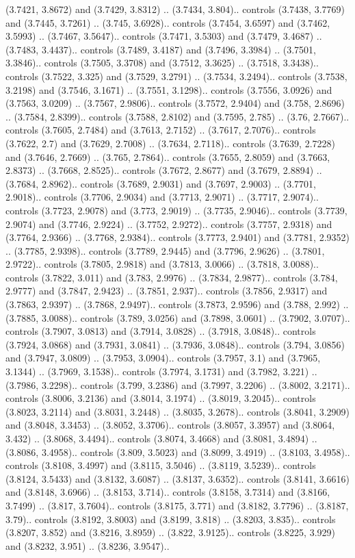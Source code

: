 (3.7421, 3.8672) and (3.7429, 3.8312) .. (3.7434, 3.804).. controls (3.7438, 3.7769) and (3.7445, 3.7261) .. (3.745, 3.6928).. controls (3.7454, 3.6597) and (3.7462, 3.5993) .. (3.7467, 3.5647).. controls (3.7471, 3.5303) and (3.7479, 3.4687) .. (3.7483, 3.4437).. controls (3.7489, 3.4187) and (3.7496, 3.3984) .. (3.7501, 3.3846).. controls (3.7505, 3.3708) and (3.7512, 3.3625) .. (3.7518, 3.3438).. controls (3.7522, 3.325) and (3.7529, 3.2791) .. (3.7534, 3.2494).. controls (3.7538, 3.2198) and (3.7546, 3.1671) .. (3.7551, 3.1298).. controls (3.7556, 3.0926) and (3.7563, 3.0209) .. (3.7567, 2.9806).. controls (3.7572, 2.9404) and (3.758, 2.8696) .. (3.7584, 2.8399).. controls (3.7588, 2.8102) and (3.7595, 2.785) .. (3.76, 2.7667).. controls (3.7605, 2.7484) and (3.7613, 2.7152) .. (3.7617, 2.7076).. controls (3.7622, 2.7) and (3.7629, 2.7008) .. (3.7634, 2.7118).. controls (3.7639, 2.7228) and (3.7646, 2.7669) .. (3.765, 2.7864).. controls (3.7655, 2.8059) and (3.7663, 2.8373) .. (3.7668, 2.8525).. controls (3.7672, 2.8677) and (3.7679, 2.8894) .. (3.7684, 2.8962).. controls (3.7689, 2.9031) and (3.7697, 2.9003) .. (3.7701, 2.9018).. controls (3.7706, 2.9034) and (3.7713, 2.9071) .. (3.7717, 2.9074).. controls (3.7723, 2.9078) and (3.773, 2.9019) .. (3.7735, 2.9046).. controls (3.7739, 2.9074) and (3.7746, 2.9224) .. (3.7752, 2.9272).. controls (3.7757, 2.9318) and (3.7764, 2.9366) .. (3.7768, 2.9384).. controls (3.7773, 2.9401) and (3.7781, 2.9352) .. (3.7785, 2.9398).. controls (3.7789, 2.9445) and (3.7796, 2.9626) .. (3.7801, 2.9722).. controls (3.7805, 2.9818) and (3.7813, 3.0066) .. (3.7818, 3.0088).. controls (3.7822, 3.011) and (3.783, 2.9976) .. (3.7834, 2.9877).. controls (3.784, 2.9777) and (3.7847, 2.9423) .. (3.7851, 2.937).. controls (3.7856, 2.9317) and (3.7863, 2.9397) .. (3.7868, 2.9497).. controls (3.7873, 2.9596) and (3.788, 2.992) .. (3.7885, 3.0088).. controls (3.789, 3.0256) and (3.7898, 3.0601) .. (3.7902, 3.0707).. controls (3.7907, 3.0813) and (3.7914, 3.0828) .. (3.7918, 3.0848).. controls (3.7924, 3.0868) and (3.7931, 3.0841) .. (3.7936, 3.0848).. controls (3.794, 3.0856) and (3.7947, 3.0809) .. (3.7953, 3.0904).. controls (3.7957, 3.1) and (3.7965, 3.1344) .. (3.7969, 3.1538).. controls (3.7974, 3.1731) and (3.7982, 3.221) .. (3.7986, 3.2298).. controls (3.799, 3.2386) and (3.7997, 3.2206) .. (3.8002, 3.2171).. controls (3.8006, 3.2136) and (3.8014, 3.1974) .. (3.8019, 3.2045).. controls (3.8023, 3.2114) and (3.8031, 3.2448) .. (3.8035, 3.2678).. controls (3.8041, 3.2909) and (3.8048, 3.3453) .. (3.8052, 3.3706).. controls (3.8057, 3.3957) and (3.8064, 3.432) .. (3.8068, 3.4494).. controls (3.8074, 3.4668) and (3.8081, 3.4894) .. (3.8086, 3.4958).. controls (3.809, 3.5023) and (3.8099, 3.4919) .. (3.8103, 3.4958).. controls (3.8108, 3.4997) and (3.8115, 3.5046) .. (3.8119, 3.5239).. controls (3.8124, 3.5433) and (3.8132, 3.6087) .. (3.8137, 3.6352).. controls (3.8141, 3.6616) and (3.8148, 3.6966) .. (3.8153, 3.714).. controls (3.8158, 3.7314) and (3.8166, 3.7499) .. (3.817, 3.7604).. controls (3.8175, 3.771) and (3.8182, 3.7796) .. (3.8187, 3.79).. controls (3.8192, 3.8003) and (3.8199, 3.818) .. (3.8203, 3.835).. controls (3.8207, 3.852) and (3.8216, 3.8959) .. (3.822, 3.9125).. controls (3.8225, 3.929) and (3.8232, 3.951) .. (3.8236, 3.9547).. 